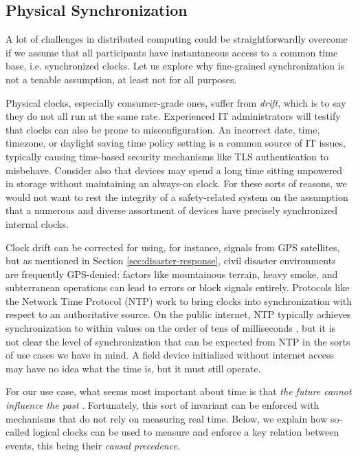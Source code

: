 \documentclass[]             %
{NASA}                       %
\theoremstyle{definition}
\begin{document}
\subsection{Physical Synchronization}
\label{ssec:physical-synchronization}
A lot of challenges in distributed computing could be
straightforwardly overcome if we assume that all participants have
instantaneous access to a common time base, i.e.  synchronized
clocks. Let us explore why fine-grained synchronization is not a
tenable assumption, at least not for all purposes.

Physical clocks, especially consumer-grade ones, suffer from
\emph{drift}, which is to say they do not all run at the same
rate. Experienced IT administrators will testify that clocks can also
be prone to misconfiguration. An incorrect date, time, timezone, or
daylight saving time policy setting is a common source of IT issues,
typically causing time-based security mechanisms like TLS
authentication to misbehave. Consider also that devices may spend a
long time sitting unpowered in storage without maintaining an
always-on clock. For these sorts of reasons, we would not want to rest
the integrity of a safety-related system on the assumption that a
numerous and diverse assortment of devices have precisely synchronized
internal clocks.

Clock drift can be corrected for using, for instance, signals from GPS
satellites, but as mentioned in Section \ref{sec:disaster-response},
civil disaster environments are frequently GPS-denied: factors like
mountainous terrain, heavy smoke, and subterranean operations can lead
to errors or block signals entirely. Protocols like the Network Time
Protocol (NTP) \cite{rfc1119} work to bring clocks into
synchronization with respect to an authoritative source. On the public
internet, NTP typically achieves synchronization to within values on the
order of tens of milliseconds \cite{rfc1128}, but it is not clear the
level of synchronization that can be expected from NTP in the sorts of use
cases we have in mind. A field device initialized without internet
access may have no idea what the time is, but it must still operate.

For our use case, what seems most important about time is that
\emph{the future cannot influence the past}
\cite{1989mattern}. Fortunately, this sort of invariant can be
enforced with mechanisms that do not rely on measuring real
time. Below, we explain how so-called logical clocks can be used to
measure and enforce a key relation between events, this being their
\emph{causal precedence}.
\end{document}
